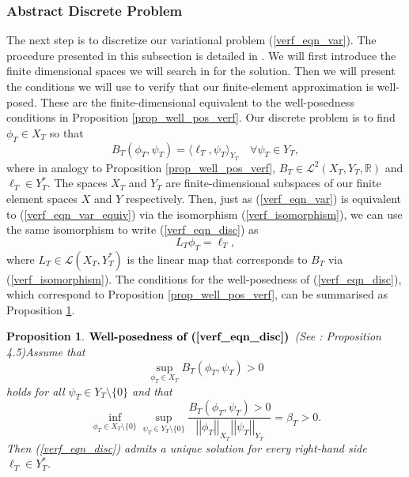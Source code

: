 \documentclass[12pt,a4paper]{article}
\newtheorem{proposition}[theorem]{Proposition}
\theoremstyle{definition}
\begin{document}
\subsubsection{Abstract Discrete Problem}
The  next step is to discretize our variational problem (\ref{verf_eqn_var}).  The procedure presented in this subsection is detailed in  \cite[\S4.1.1]{verfurth2013posteriori}.  We will first introduce the finite dimensional spaces we will search in for the solution.  Then we will present the conditions we will use to verify that our finite-element approximation is well-posed.  These are the finite-dimensional equivalent  to the well-posedness conditions in Proposition \ref{prop_well_pos_verf}.  Our  discrete problem  is to find $\phi_T\in X_T$ so that
\begin{equation}\label{verf_eqn_disc}
B_T\left(\phi_T,\psi_T\right)=\langle\ell_T,\psi_T\rangle_{Y_T}\quad \forall \psi_T \in Y_T,
\end{equation}
where in analogy to Proposition \ref{prop_well_pos_verf}, $B_T\in \mathcal{L}^2\left(X_T,Y_T,\mathbb{R}\right)$ and $\ell_T\in Y^*_T$.  The spaces $X_T$ and $Y_T$ are finite-dimensional subspaces of our finite element spaces $X$ and $Y$ respectively.   Then, just as (\ref{verf_eqn_var}) is equivalent to (\ref{verf_eqn_var_equiv}) via the isomorphism (\ref{verf_isomorphism}), we can use the same isomorphism to write (\ref{verf_eqn_disc}) as 
\begin{equation}\label{verf_eqn_var_equiv_disc}
L_T\phi_T=\ell_T,
\end{equation}
where $L_T\in\mathcal{L}\left(X_T,Y_T^*\right)$ is the linear map that corresponds to $B_T$ via (\ref{verf_isomorphism}).   The conditions for the well-posedness of (\ref{verf_eqn_disc}), which correspond to Proposition \ref{prop_well_pos_verf}, can be summarised as Proposition \ref{prop_well_pos_verf_disc}.
\begin{proposition}{$\textbf{Well-posedness of (\ref{verf_eqn_disc})}$} (See \cite[\S 4.1.3]{verfurth2013posteriori}:  Proposition 4.5)\label{prop_well_pos_verf_disc}
	Assume that 
	\begin{equation}
	\sup_{\phi_T \in X_T}B_T\left(\phi_T,\psi_T\right)>0
	\end{equation}
	holds for all $\psi_T\in Y_T\setminus \lbrace 0 \rbrace$ and that
	\begin{equation}
	\inf_{\phi_T\in X_T\setminus \lbrace0\rbrace}\sup_{\psi_T \in Y_T\setminus \lbrace 0\rbrace}\frac{B_T\left(\phi_T,\psi_T\right)>0}{\left|\left|\phi_T\right|\right|_{X_T}\left|\left|\psi_T\right|\right|_{Y_T}}=\beta_T > 0.
	\end{equation}
	Then (\ref{verf_eqn_disc}) admits a unique solution for every right-hand side $\ell_T\in Y^*_T$.
\end{proposition}
\end{document}
